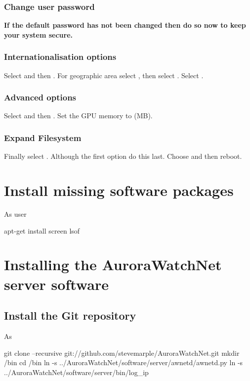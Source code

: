 \subsubsection{Change user password}
\textbf{If the default password has not been changed then do so now to keep
your system secure.}

\subsubsection{Internationalisation options}
Select  and then
. For geographic area select %
, then select . Select .

\subsubsection{Advanced options}
Select  and then . Set the GPU memory to  (MB).

\subsubsection{Expand Filesystem}
Finally select . Although the first option
do this last. Choose  and then reboot.

\section{Install missing software packages}
As user \rootUser
\begin{Cmd}
apt-get install screen lsof
\end{Cmd}

\section{Installing the AuroraWatchNet server software}

\subsection{Install the Git repository}
As \piUser
\begin{Cmd}
git clone --recursive git://github.com/stevemarple/AuroraWatchNet.git
mkdir \mytilde/bin
cd \mytilde/bin
ln -s ../AuroraWatchNet/software/server/awnetd/awnetd.py
ln -s ../AuroraWatchNet/software/server/bin/log_ip
\end{Cmd}

